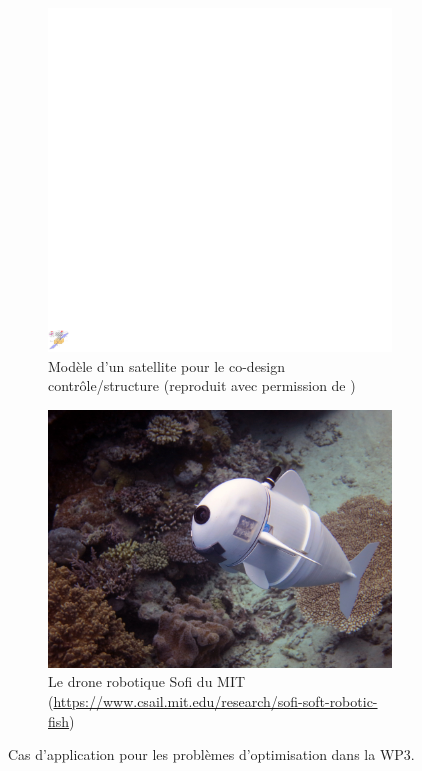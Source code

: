 \documentclass[12pt, french]{article}
\begin{document}
\begin{figure}[htb]
\begin{subfigure}[t]{0.3\textwidth}
			\includegraphics[width=\columnwidth]{Codesign_satellite.pdf} 
			\caption{Modèle d'un satellite pour le co-design contrôle/structure (reproduit avec permission de \cite{finozzi2022sub})}
			\label{fig:codesign_sat}
		\end{subfigure}\hfill
		\begin{subfigure}[t]{0.35\textwidth}
			\includegraphics[width=\columnwidth]{Sofi_MIT.jpeg}%
			\caption{Le drone robotique Sofi du MIT (\url{https://www.csail.mit.edu/research/sofi-soft-robotic-fish})}
			\label{fig:sofi-mit}
		\end{subfigure}
		\caption[]{Cas d'application pour les problèmes d'optimisation dans la WP3.}%
		\label{fig:optmisation}%
	\end{figure}
	
\end{document}
